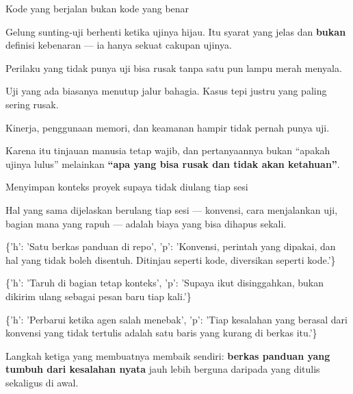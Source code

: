 \documentclass[aspectratio=169,11pt,t]{beamer}
\begin{document}
\begin{frame}[shrink=25]{Kode yang berjalan bukan kode yang benar}
{\fontsize{9.4}{12.6}\selectfont\color{fg2}Gelung sunting-uji berhenti ketika ujinya hijau. Itu syarat yang jelas dan \textbf{bukan} definisi kebenaran --- ia hanya sekuat cakupan ujinya.\par}\vskip 4pt
\begin{minipage}[t]{0.3253\textwidth}
\begin{icardbad}
Perilaku yang tidak punya uji bisa rusak tanpa satu pun lampu merah menyala.
\end{icardbad}
\end{minipage}%
\hfill
\begin{minipage}[t]{0.3253\textwidth}
\begin{icardbad}
Uji yang ada biasanya menutup jalur bahagia. Kasus tepi justru yang paling sering rusak.
\end{icardbad}
\end{minipage}%
\hfill
\begin{minipage}[t]{0.3253\textwidth}
\begin{icardbad}
Kinerja, penggunaan memori, dan keamanan hampir tidak pernah punya uji.
\end{icardbad}
\end{minipage}%
\begin{iband}[signal]
Karena itu tinjauan manusia tetap wajib, dan pertanyaannya bukan ``apakah ujinya lulus'' melainkan \textbf{``apa yang bisa rusak dan tidak akan ketahuan''}.
\end{iband}
\end{frame}

\begin{frame}[shrink=25]{Menyimpan konteks proyek supaya tidak diulang tiap sesi}
{\fontsize{9.4}{12.6}\selectfont\color{fg2}Hal yang sama dijelaskan berulang tiap sesi --- konvensi, cara menjalankan uji, bagian mana yang rapuh --- adalah biaya yang bisa dihapus sekali.\par}\vskip 4pt
\begin{isteps}
\item \{'h': 'Satu berkas panduan di repo', 'p': 'Konvensi, perintah yang dipakai, dan hal yang tidak boleh disentuh. Ditinjau seperti kode, diversikan seperti kode.'\}
\item \{'h': 'Taruh di bagian tetap konteks', 'p': 'Supaya ikut disinggahkan, bukan dikirim ulang sebagai pesan baru tiap kali.'\}
\item \{'h': 'Perbarui ketika agen salah menebak', 'p': 'Tiap kesalahan yang berasal dari konvensi yang tidak tertulis adalah satu baris yang kurang di berkas itu.'\}
\end{isteps}
\begin{iband}[signal]
Langkah ketiga yang membuatnya membaik sendiri: \textbf{berkas panduan yang tumbuh dari kesalahan nyata} jauh lebih berguna daripada yang ditulis sekaligus di awal.
\end{iband}
\end{frame}
\end{document}
